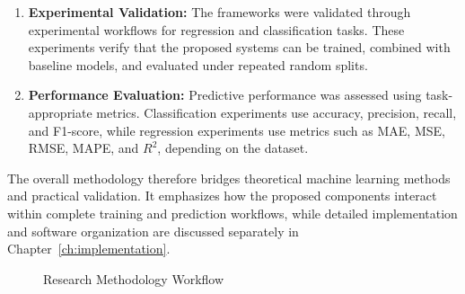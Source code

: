 \begin{enumerate}
    \item \textbf{Experimental Validation:} The frameworks were validated through experimental workflows for regression and classification tasks. These experiments verify that the proposed systems can be trained, combined with baseline models, and evaluated under repeated random splits.

    \item \textbf{Performance Evaluation:} Predictive performance was assessed using task-appropriate metrics. Classification experiments use accuracy, precision, recall, and F1-score, while regression experiments use metrics such as MAE, MSE, RMSE, MAPE, and $R^2$, depending on the dataset.

\end{enumerate}

The overall methodology therefore bridges theoretical machine learning methods and practical validation. It emphasizes how the proposed components interact within complete training and prediction workflows, while detailed implementation and software organization are discussed separately in Chapter~\ref{ch:implementation}.

\begin{figure}[H]
    \centering
    \caption{Research Methodology Workflow}
    \label{fig:research_workflow}
\end{figure}

